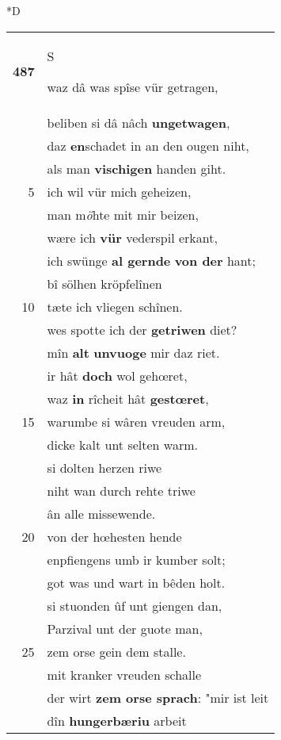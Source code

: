 \documentclass[8pt,a4paper,notitlepage]{article}
\begin{document}
\begin{table}[ht]
\begin{minipage}[t]{0.5\linewidth}
\small
\begin{center}*D
\end{center}
\begin{tabular}{rl}
\textbf{487} & \begin{large}S\end{large}waz dâ was spîse vür getragen,\\ 
 & beliben si dâ nâch \textbf{ungetwagen},\\ 
 & daz \textbf{en}schadet in an den ougen niht,\\ 
 & als man \textbf{vischigen} handen giht.\\ 
5 & ich wil vür mich geheizen,\\ 
 & man m\textit{ö}hte mit mir beizen,\\ 
 & wære ich \textbf{vür} vederspil erkant,\\ 
 & ich swünge \textbf{al gernde} \textbf{von der} hant;\\ 
 & bî sölhen kröpfelînen\\ 
10 & tæte ich vliegen schînen.\\ 
 & wes spotte ich der \textbf{getriwen} diet?\\ 
 & mîn \textbf{alt} \textbf{unvuoge} mir daz riet.\\ 
 & ir hât \textbf{doch} wol gehœret,\\ 
 & waz \textbf{in} rîcheit hât \textbf{gestœret},\\ 
15 & warumbe si wâren vreuden arm,\\ 
 & dicke kalt unt selten warm.\\ 
 & si dolten herzen riwe\\ 
 & niht wan durch rehte triwe\\ 
 & ân alle missewende.\\ 
20 & von der hœhesten hende\\ 
 & enpfiengens umb ir kumber solt;\\ 
 & got was und wart in bêden holt.\\ 
 & si stuonden ûf unt giengen dan,\\ 
 & Parzival unt der guote man,\\ 
25 & zem orse gein dem stalle.\\ 
 & mit kranker vreuden schalle\\ 
 & der wirt \textbf{zem orse sprach}: "mir ist leit\\ 
 & dîn \textbf{hungerbæriu} arbeit\\ 

\end{tabular}
\end{minipage}
\end{table}
\end{document}
